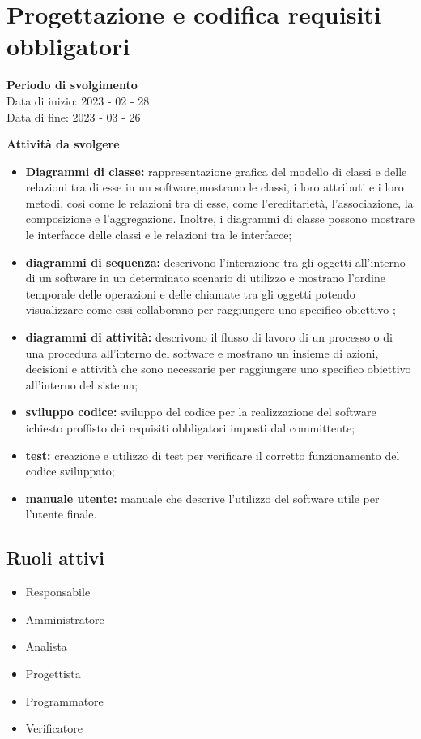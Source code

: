 \section{Progettazione e codifica requisiti obbligatori}

\textbf{Periodo di svolgimento}
\\ Data di inizio: 2023 - 02 - 28 \\ Data di fine: 2023 - 03 - 26

\textbf{Attività da svolgere}
    \begin{itemize}
        \item \textbf{Diagrammi di classe:} rappresentazione grafica del modello di classi e delle relazioni tra di esse in un software,mostrano le classi, i loro attributi e i loro metodi, così come le relazioni tra di esse, come l'ereditarietà, l'associazione, la composizione e l'aggregazione. Inoltre, i diagrammi di classe possono mostrare le interfacce delle classi e le relazioni tra le interfacce; 
        \item \textbf{diagrammi di sequenza:} descrivono l'interazione tra gli oggetti all'interno di un software in un determinato scenario di utilizzo e mostrano l'ordine temporale delle operazioni e delle chiamate tra gli oggetti potendo visualizzare come essi collaborano per raggiungere uno specifico obiettivo ;
        \item \textbf{diagrammi di attività:} descrivono il flusso di lavoro di un processo o di una procedura all'interno del software e mostrano un insieme di azioni, decisioni e attività che sono necessarie per raggiungere uno specifico obiettivo all'interno del sistema;
        \item \textbf{sviluppo codice:} sviluppo del codice per la realizzazione del software ichiesto proffisto dei requisiti obbligatori imposti dal committente;
        \item \textbf{test:} creazione e utilizzo di test per verificare il corretto funzionamento del codice sviluppato;
        \item \textbf{manuale utente:} manuale che descrive l'utilizzo del software utile per l'utente finale.
    \end{itemize}

\subsection{Ruoli attivi}
\begin{itemize}
    \item Responsabile 
    \item Amministratore
    \item Analista
    \item Progettista 
    \item Programmatore 
    \item Verificatore 
\end{itemize}

